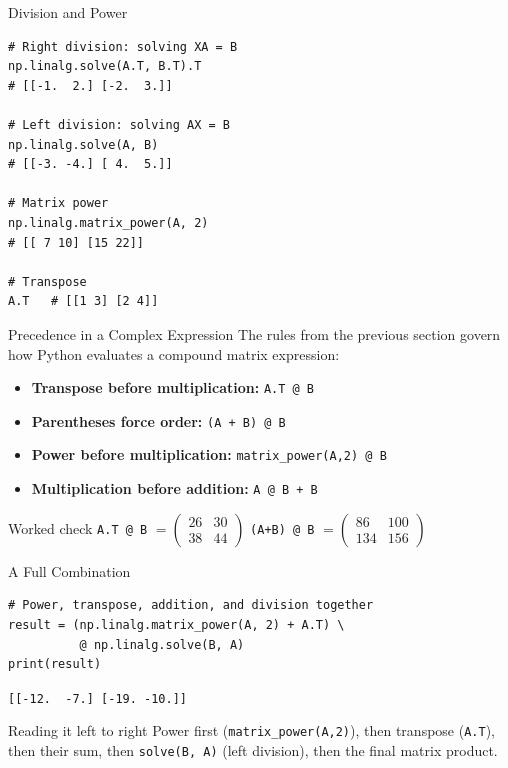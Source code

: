 \documentclass[9pt,aspectratio=169,xcolor=table]{beamer}
\begin{document}
\begin{frame}[fragile]{Division and Power}
    \leavevmode
\begin{lstlisting}
# Right division: solving XA = B
np.linalg.solve(A.T, B.T).T
# [[-1.  2.] [-2.  3.]]

# Left division: solving AX = B
np.linalg.solve(A, B)
# [[-3. -4.] [ 4.  5.]]

# Matrix power
np.linalg.matrix_power(A, 2)
# [[ 7 10] [15 22]]

# Transpose
A.T   # [[1 3] [2 4]]
\end{lstlisting}
\end{frame}

\begin{frame}{Precedence in a Complex Expression}
    \leavevmode
    \small
    The rules from the previous section govern how Python evaluates a
    compound matrix expression:

    \begin{itemize}\itemsep2pt
        \item \textbf{Transpose before multiplication:} \texttt{A.T @ B}
        \item \textbf{Parentheses force order:} \texttt{(A + B) @ B}
        \item \textbf{Power before multiplication:}
              \texttt{matrix\_power(A,2) @ B}
        \item \textbf{Multiplication before addition:} \texttt{A @ B + B}
    \end{itemize}

    \vspace{2mm}
    \begin{block}{Worked check}
        \texttt{A.T @ B} $=
        \begin{pmatrix} 26 & 30 \\ 38 & 44 \end{pmatrix}$ \qquad
        \texttt{(A+B) @ B} $=
        \begin{pmatrix} 86 & 100 \\ 134 & 156 \end{pmatrix}$
    \end{block}
\end{frame}

\begin{frame}[fragile]{A Full Combination}
    \leavevmode
\begin{lstlisting}
# Power, transpose, addition, and division together
result = (np.linalg.matrix_power(A, 2) + A.T) \
          @ np.linalg.solve(B, A)
print(result)
\end{lstlisting}

    \texttt{[[-12.\ \ -7.] [-19. -10.]]}

    \vspace{3mm}
    \begin{block}{Reading it left to right}
        Power first (\texttt{matrix\_power(A,2)}), then transpose
        (\texttt{A.T}), then their sum, then \texttt{solve(B, A)}
        (left division), then the final matrix product.
    \end{block}
\end{frame}
\end{document}
